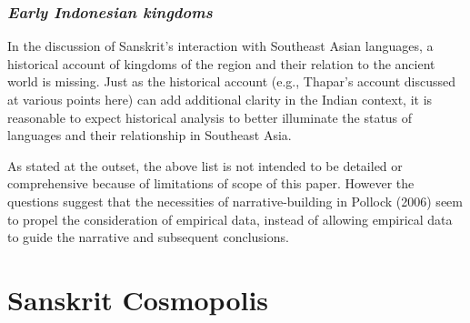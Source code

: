 \subsubsection{{\sl Early Indonesian kingdoms}}

In the discussion of Sanskrit’s interaction with Southeast Asian languages, a historical account of kingdoms of the region and their relation to the ancient world is missing. Just as the historical account (e.g., Thapar’s account discussed at various points here) can add additional clarity in the Indian context, it is reasonable to expect historical analysis to better illuminate the status of languages and their relationship in Southeast Asia. 

As stated at the outset, the above list is not intended to be detailed or comprehensive because of limitations of scope of this paper. However the questions suggest that the necessities of narrative-building in Pollock (2006) seem to propel the consideration of empirical data, instead of allowing empirical data to guide the narrative and subsequent conclusions. 

\section{Sanskrit Cosmopolis}


